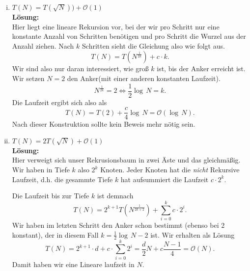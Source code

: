 \documentclass[11pt,a4paper,ngerman]{article}
\begin{document}
\begin{enumerate}[(i)]
	\item $T(N) = T(\sqrt{N})) + \mathcal{O}(1)$\\
	\noindent\textbf{Lösung:}\\
		Hier liegt eine lineare Rekursion vor, bei der wir pro Schritt nur eine konstante Anzahl von Schritten benötigen
		und pro Schritt die Wurzel aus der Anzahl ziehen. Nach $k$ Schritten sieht die Gleichung also wie folgt aus.
		$$
			T(N) = T(N^\frac{1}{2k}) + c \cdot k.
		$$
		Wir sind also nur daran interessiert, wie groß $k$ ist, bis der Anker erreicht ist. Wir setzen $N=2$ den Anker(mit
		einer anderen konstanten Laufzeit).
		$$
			N^\frac{1}{2k} = 2 \Leftrightarrow \frac{1}{2} \log \, N = k.
		$$
		Die Laufzeit ergibt sich also als
		$$
			T(N) = T(2) + \frac{c}{4} \log \, N = \mathcal{O}(\log \, N).
		$$
		Nach dieser Konstruktion sollte kein Beweis mehr nötig sein.

	\item $T(N) = 2T(\sqrt{N}) + \mathcal{O}(1)$\\
	\noindent\textbf{Lösung:}\\
		Hier verweigt sich unser Rekrusionsbaum in zwei Äste und das gleichmäßig.
		Wir haben in Tiefe $k$ also $2^k$ Knoten. Jeder Knoten hat die \emph{nicht} Rekursive Laufzeit,
		d.h. die gesammte Tiefe $k$ hat aufsummiert die Laufzeit $c \cdot 2^k$.

		Die Laufzeit bis zur Tiefe $k$ ist demnach
		$$
			T(N) = 2^{k+1}T(N^\frac{1}{2k+2}) + \sum_{i=0}^kc \cdot 2^i.
		$$
		Wir haben im letzten Schritt den Anker schon bestimmt (ebenso bei $2$ konstant), 
		der in diesem Fall $k = \frac{1}{2} \log \, N - 2$ ist.
		Wir erhalten als Lösung
		$$
			T(N) = 2^{k+1} \cdot d + c \cdot \sum_{i=0}^k 2^i = \frac{d}{2} N + c \frac{N - 1}{4} = \mathcal{O}(N).
		$$
		Damit haben wir eine Lineare laufzeit in $N$.


\end{enumerate}
\end{document}
